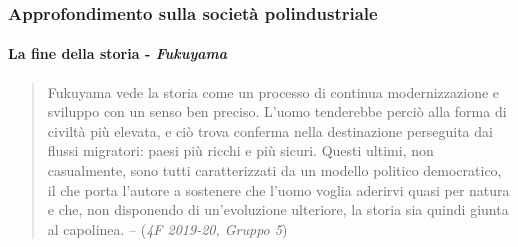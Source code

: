 \documentclass{article}
\begin{document}
\begin{center}
\end{center}
\phantom{}

\subsubsection{Approfondimento sulla società polindustriale}

\paragraph{La fine della storia - \textit{Fukuyama}}
\begin{quote}
    Fukuyama vede la storia come un processo di continua 
    modernizzazione e sviluppo con un senso ben preciso. L’uomo 
    tenderebbe perciò alla forma di civiltà più elevata, e ciò trova 
    conferma nella destinazione perseguita dai flussi migratori: paesi 
    più ricchi e più sicuri. Questi ultimi, non casualmente, sono tutti 
    caratterizzati da un modello politico democratico, il che porta 
    l’autore a sostenere che l’uomo voglia aderirvi quasi per natura e 
    che, non disponendo di un’evoluzione ulteriore, la storia sia quindi 
    giunta al capolinea. -- (\textit{4F 2019-20, Gruppo 5})
\end{quote} \phantom{}
\end{document}

